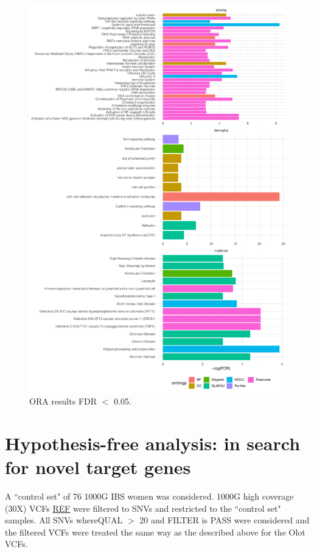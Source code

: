 \documentclass{article}\usepackage[]{graphicx}\usepackage[dvipsnames]{xcolor}
\begin{document}
\begin{figure}[h]%
\centering
        \includegraphics[totalheight=16cm]{barplot}
    \caption{ORA results FDR $<$ 0.05.}
    \label{fig:ORA}
\end{figure}







\section{Hypothesis-free analysis: in search for novel target genes}
\label{sec:free}

A ``control set" of 76 1000G IBS women was considered. 1000G high coverage (30X) VCFs \href{REF}{REF} were filtered to SNVs and restricted to the ``control set" samples. All SNVs whereQUAL $>$ 20 and  FILTER is PASS were considered and the filtered VCFs were treated the same way as the described above for the Olot VCFs. 
\end{document}
